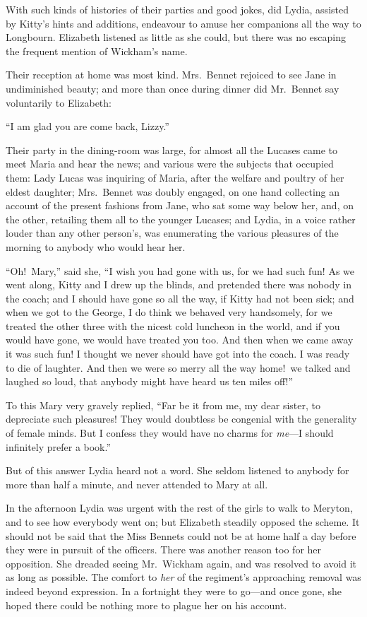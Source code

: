 \documentclass[12pt,english]{book}
\begin{document}
With such kinds of histories of their parties and good jokes, did
Lydia, assisted by Kitty's hints and additions, endeavour to amuse
her companions all the way to Longbourn. Elizabeth listened as little
as she could, but there was no escaping the frequent mention of Wickham's
name.

Their reception at home was most kind. Mrs.\ Bennet rejoiced to see
Jane in undiminished beauty; and more than once during dinner did
Mr.\ Bennet say voluntarily to Elizabeth:

{}``I am glad you are come back, Lizzy.''

Their party in the dining-room was large, for almost all the Lucases
came to meet Maria and hear the news; and various were the subjects
that occupied them: Lady Lucas was inquiring of Maria, after the welfare
and poultry of her eldest daughter; Mrs.\ Bennet was doubly engaged,
on one hand collecting an account of the present fashions from Jane,
who sat some way below her, and, on the other, retailing them all
to the younger Lucases; and Lydia, in a voice rather louder than any
other person's, was enumerating the various pleasures of the morning
to anybody who would hear her.

{}``Oh!\ Mary,'' said she, {}``I wish you had gone with us, for
we had such fun! As we went along, Kitty and I drew up the blinds,
and pretended there was nobody in the coach; and I should have gone
so all the way, if Kitty had not been sick; and when we got to the
George, I do think we behaved very handsomely, for we treated the
other three with the nicest cold luncheon in the world, and if you
would have gone, we would have treated you too. And then when we came
away it was such fun! I thought we never should have got into the
coach. I was ready to die of laughter. And then we were so merry all
the way home!\ we talked and laughed so loud, that anybody might
have heard us ten miles off!''\ 

To this Mary very gravely replied, {}``Far be it from me, my dear
sister, to depreciate such pleasures! They would doubtless be congenial
with the generality of female minds. But I confess they would have
no charms for \textit{me}---I should infinitely prefer a book.''

But of this answer Lydia heard not a word. She seldom listened to
anybody for more than half a minute, and never attended to Mary at
all.

In the afternoon Lydia was urgent with the rest of the girls to walk
to Meryton, and to see how everybody went on; but Elizabeth steadily
opposed the scheme. It should not be said that the Miss Bennets could
not be at home half a day before they were in pursuit of the officers.
There was another reason too for her opposition. She dreaded seeing
Mr.\ Wickham again, and was resolved to avoid it as long as possible.
The comfort to \textit{her} of the regiment's approaching removal
was indeed beyond expression. In a fortnight they were to go\mbox{---}and
once gone, she hoped there could be nothing more to plague her on
his account.
\end{document}
